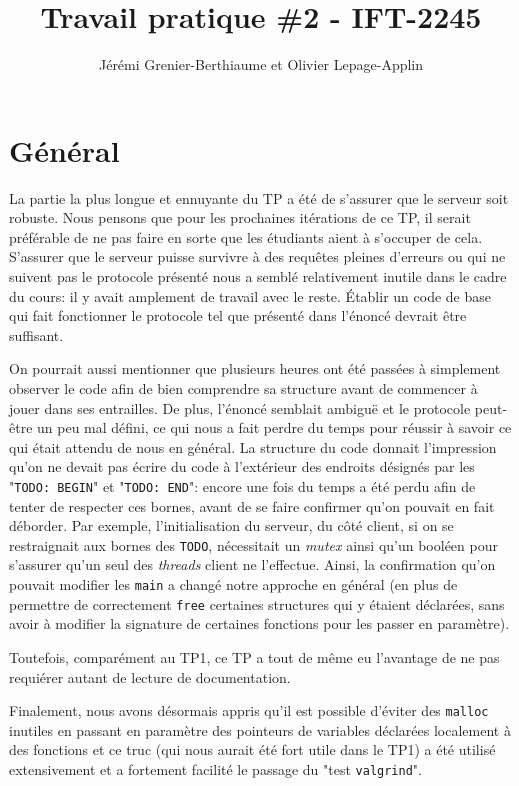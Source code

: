 \documentclass[11pt]{article}
\title{Travail pratique \#2 - IFT-2245}
\author{Jérémi Grenier-Berthiaume et Olivier Lepage-Applin}
\begin{document}
\maketitle

\section{Général}

La partie la plus longue et ennuyante du TP a été de s'assurer que le serveur soit robuste. Nous pensons que pour les prochaines itérations de ce TP, il serait préférable de ne pas faire en sorte que les étudiants aient à s'occuper de cela. S'assurer que le serveur puisse survivre à des requêtes pleines d'erreurs ou qui ne suivent pas le protocole présenté nous a semblé relativement inutile dans le cadre du cours: il y avait amplement de travail avec le reste. Établir un code de base qui fait fonctionner le protocole tel que présenté dans l'énoncé devrait être suffisant.

On pourrait aussi mentionner que plusieurs heures ont été passées à simplement observer le code afin de bien comprendre sa structure avant de commencer à jouer dans ses entrailles. De plus, l'énoncé semblait ambiguë et le protocole peut-être un peu mal défini, ce qui nous a fait perdre du temps pour réussir à savoir ce qui était attendu de nous en général. La structure du code donnait l'impression qu'on ne devait pas écrire du code à l'extérieur des endroits désignés par les "\texttt{TODO: BEGIN}" et "\texttt{TODO: END}": encore une fois du temps a été perdu afin de tenter de respecter ces bornes, avant de se faire confirmer qu'on pouvait en fait déborder. Par exemple, l'initialisation du serveur, du côté client, si on se restraignait aux bornes des \texttt{TODO}, nécessitait un \textit{mutex} ainsi qu'un booléen pour s'assurer qu'un seul des \textit{threads} client ne l'effectue. Ainsi, la confirmation qu'on pouvait modifier les \texttt{main} a changé notre approche en général (en plus de permettre de correctement \texttt{free} certaines structures qui y étaient déclarées, sans avoir à modifier la signature de certaines fonctions pour les passer en paramètre).

Toutefois, comparément au TP1, ce TP a tout de même eu l'avantage de ne pas requiérer autant de lecture de documentation. 

Finalement, nous avons désormais appris qu'il est possible d'éviter des \texttt{malloc} inutiles en passant en paramètre des pointeurs de variables déclarées localement à des fonctions et ce truc (qui nous aurait été fort utile dans le TP1) a été utilisé extensivement et a fortement facilité le passage du "test \texttt{valgrind}".
\end{document}

